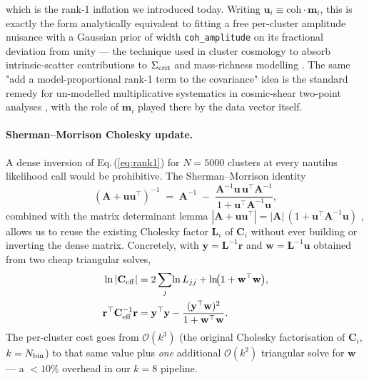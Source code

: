 \documentclass[11pt,a4paper]{article}
\begin{document}
which is the rank-1 inflation we introduced today.  Writing
$\mathbf{u}_i \equiv \mathrm{coh}\cdot\mathbf{m}_i$, this is exactly the
form analytically equivalent to fitting a free per-cluster amplitude
nuisance with a Gaussian prior of width \texttt{coh\_amplitude} on its
fractional deviation from unity — the technique used in cluster cosmology
to absorb intrinsic-scatter contributions to $\Sigma_{\rm crit}$ and
mass-richness modelling \citep[e.g.][]{Mantz2010,Mantz2015}.  The same
"add a model-proportional rank-1 term to the covariance" idea is the
standard remedy for un-modelled multiplicative systematics in cosmic-shear
two-point analyses \citep[][\S 4.5]{Heymans2013}, with the role of
$\mathbf{m}_i$ played there by the data vector itself.

\paragraph{Sherman--Morrison Cholesky update.}
A dense inversion of Eq.\,(\ref{eq:rank1}) for $N=5000$ clusters at
every nautilus likelihood call would be prohibitive.  The Sherman--Morrison
identity \citep{ShermanMorrison1950}
\begin{equation}
  (\mathbf{A} + \mathbf{u}\mathbf{u}^\top)^{-1} \;=\;
   \mathbf{A}^{-1}
   \;-\; \frac{\mathbf{A}^{-1}\mathbf{u}\,\mathbf{u}^\top \mathbf{A}^{-1}}
              {1 + \mathbf{u}^\top \mathbf{A}^{-1}\mathbf{u}},
  \label{eq:sm}
\end{equation}
combined with the matrix determinant lemma
$|\mathbf{A}+\mathbf{u}\mathbf{u}^\top| = |\mathbf{A}|\,(1+\mathbf{u}^\top\mathbf{A}^{-1}\mathbf{u})$
\citep[][Eq.\,1.5.13]{Harville2008}, allows us to reuse the existing
Cholesky factor $\mathbf{L}_i$ of $\mathbf{C}_i$ without ever building or
inverting the dense matrix.  Concretely, with
$\mathbf{y}=\mathbf{L}^{-1}\mathbf{r}$ and $\mathbf{w}=\mathbf{L}^{-1}\mathbf{u}$
obtained from two cheap triangular solves,
\begin{align}
  \ln|\mathbf{C}_{\rm eff}|     &= 2\sum_j\!\ln L_{jj} + \ln\!\bigl(1 + \mathbf{w}^\top\mathbf{w}\bigr), \label{eq:logdet}\\
  \mathbf{r}^\top\mathbf{C}_{\rm eff}^{-1}\mathbf{r} &= \mathbf{y}^\top\mathbf{y}
       - \frac{(\mathbf{y}^\top\mathbf{w})^2}{1 + \mathbf{w}^\top\mathbf{w}}.
  \label{eq:quad_sm}
\end{align}
The per-cluster cost goes from $\mathcal{O}(k^3)$ (the original Cholesky
factorisation of $\mathbf{C}_i$, $k=N_{\rm bin}$) to that same value plus
\emph{one} additional $\mathcal{O}(k^2)$ triangular solve for
$\mathbf{w}$ — a $<\!10\%$ overhead in our $k=8$ pipeline.
\end{document}
